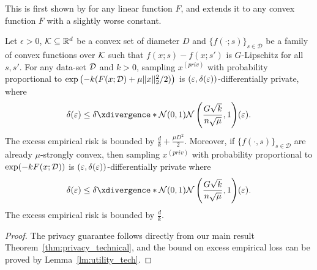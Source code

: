 This is first shown by \cite{KV06} for any linear function $F$, and \cite{BST14} extends it to any convex function $F$ with a slightly worse constant. 

\begin{theorem}[DP-ERM]\label{thm:DPERM}
Let $\epsilon>0$, $\mathcal K\subseteq \mathbb{R}^d$ be a convex set of diameter $D$ and $\{f(\cdot;s)\}_{s\in\mathcal{D}}$ be a family of convex functions over $\mathcal K$ such that $f(x;s)-f(x;s')$ is $G$-Lipschitz for all $s,s'$.
For any data-set $\mathcal D$ and $k>0$, sampling $x^{(priv)}$ with probability proportional to $\exp\left(-k(F(x;\mathcal D)+\mu\|x\|_2^2/2)\right)$ is $(\varepsilon,\delta(\varepsilon))$-differentially private, where
\begin{align*}
 \delta(\eps)\leq \deltacurve{\cN(0,1)}{\cN\lp\frac{G\sqrt{k}}{n\sqrt{\mu}},1\rp}(\epsilon).
\end{align*}
The excess empirical risk is bounded by {$\frac{d}{k}+\frac{\mu D^2}{2}$}.
Moreover, if $\{f(\cdot,s)\}_{s\in\mathcal{D}}$ are already $\mu$-strongly convex, then sampling 
$x^{(priv)}$ with probability proportional to $\exp(-kF(x;\mathcal D))$ is $(\varepsilon,\delta(\varepsilon))$-differentially private where 
\begin{align*}
 \delta(\eps)\leq \deltacurve{\cN(0,1)}{\cN\lp\frac{G\sqrt{k}}{n\sqrt{\mu}},1\rp}(\epsilon).
 \end{align*}
 The excess empirical risk is bounded by $\frac{d}{k}$.
\end{theorem}
\begin{proof}
The privacy guarantee follows directly from our main result Theorem~\ref{thm:privacy_technical}, and the bound on excess empirical loss can be proved by Lemma~\ref{lm:utility_tech}.
\end{proof}


